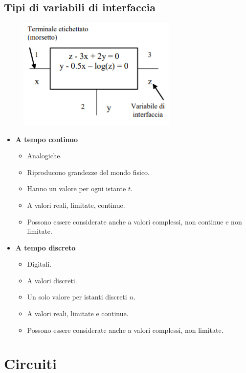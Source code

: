 \subsection*{Tipi di variabili di interfaccia}
\begin{figure}[H]
    \centering
    \includegraphics[width=0.7\textwidth]{capitoli/capitolo1/immagini/image4.png}
\end{figure} 
\begin{itemize}
    \item \textbf{A tempo continuo}
    \begin{itemize}
        \item Analogiche.
        \item Riproducono grandezze del mondo fisico.
        \item Hanno un valore per ogni istante \( t \).
        \item A valori reali, limitate, continue.
        \item Possono essere considerate anche a valori complessi, non continue e non limitate.
    \end{itemize}
    \item \textbf{A tempo discreto}
    \begin{itemize}
        \item Digitali.
        \item A valori discreti.
        \item Un solo valore per istanti discreti \( n \).
        \item A valori reali, limitate e continue.
        \item Possono essere considerate anche a valori complessi, non limitate.
    \end{itemize}
\end{itemize}

\section{Circuiti}

